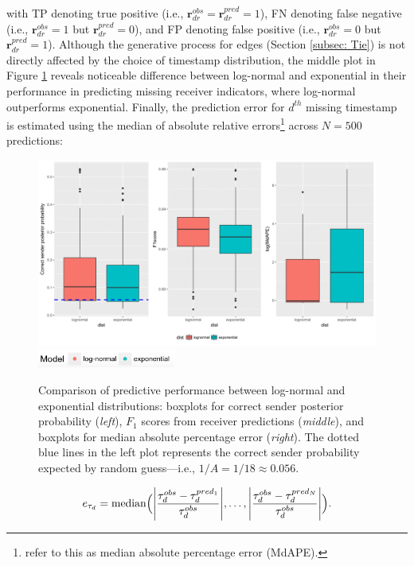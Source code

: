 \documentclass[ba]{imsart}
\numberwithin{equation}{section}
\theoremstyle{plain}
\DeclarePairedDelimiter\abs{\lvert}{\rvert}
\begin{document}
	with TP denoting true positive (i.e., $\boldsymbol{r}^{obs}_{dr}=\boldsymbol{r}^{pred}_{dr}=1$), FN denoting false negative (i.e., $\boldsymbol{r}^{obs}_{dr}=1$ but $\boldsymbol{r}^{pred}_{dr}=0$), and FP denoting false positive (i.e., $\boldsymbol{r}^{obs}_{dr}=0$ but $\boldsymbol{r}^{pred}_{dr}=1$). Although the generative process for edges (Section \ref{subsec: Tie}) is not directly affected by the choice of timestamp distribution, the middle plot in Figure \ref{figure:PPEresults} reveals noticeable difference between log-normal and exponential in their performance in predicting missing receiver indicators, where log-normal outperforms exponential. Finally, the prediction error for $d^{th}$ missing timestamp is estimated using the median of absolute relative errors\footnote{\cite{hyndman2006another} refer to this as median absolute percentage error (MdAPE).} across $N=500$ predictions:
			\begin{figure}[!t]
				\centering
				\includegraphics[width=1\textwidth]{img/PPEplotnew-1.png}	
										\includegraphics[width=0.4\textwidth]{img/modellabel.png}				
			\caption {Comparison of predictive performance between log-normal and exponential distributions: boxplots for correct sender posterior probability (\textit{left}), $F_1$ scores from receiver predictions (\textit{middle}), and boxplots for median absolute percentage error (\textit{right}). The dotted blue lines in the left plot represents the correct sender probability expected by random guess---i.e., $1/A=1/18\approx0.056$.}
				\label{figure:PPEresults}
			\end{figure}
		\begin{equation}
		e_{\tau_d} = \mbox{median}\Big(\abs*{\frac{\tau^{obs}_d - \tau^{pred_1}_{d}}{\tau^{obs}_d}},\ldots, \abs*{\frac{\tau^{obs}_d - \tau^{pred_N}_{d}}{\tau^{obs}_d}}\Big).
		\end{equation}
\end{document}
